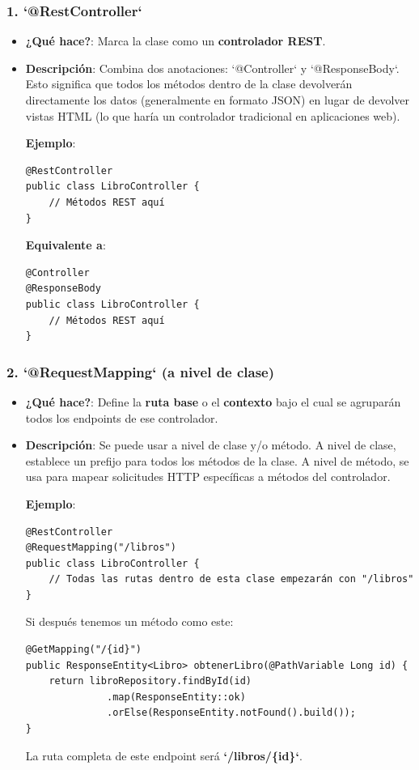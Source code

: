\documentclass[11pt]{article}
\begin{document}
\subsubsection{1. \textbf{\textbf{`@RestController`}}}
\label{sec:org89bc9d5}
\begin{itemize}
\item \textbf{\textbf{¿Qué hace?}}: Marca la clase como un \textbf{\textbf{controlador REST}}.
\item \textbf{\textbf{Descripción}}: Combina dos anotaciones: `@Controller` y `@ResponseBody`. Esto significa que todos los métodos dentro de la clase devolverán directamente los datos (generalmente en formato JSON) en lugar de devolver vistas HTML (lo que haría un controlador tradicional en aplicaciones web).

\textbf{\textbf{Ejemplo}}:
\begin{verbatim}
@RestController
public class LibroController {
    // Métodos REST aquí
}
\end{verbatim}

\textbf{\textbf{Equivalente a}}:
\begin{verbatim}
@Controller
@ResponseBody
public class LibroController {
    // Métodos REST aquí
}
\end{verbatim}
\end{itemize}

\subsubsection{2. \textbf{\textbf{`@RequestMapping`}} (a nivel de clase)}
\label{sec:orgcd28d6c}
\begin{itemize}
\item \textbf{\textbf{¿Qué hace?}}: Define la \textbf{\textbf{ruta base}} o el \textbf{\textbf{contexto}} bajo el cual se agruparán todos los endpoints de ese controlador.
\item \textbf{\textbf{Descripción}}: Se puede usar a nivel de clase y/o método. A nivel de clase, establece un prefijo para todos los métodos de la clase. A nivel de método, se usa para mapear solicitudes HTTP específicas a métodos del controlador.

\textbf{\textbf{Ejemplo}}:
\begin{verbatim}
@RestController
@RequestMapping("/libros")
public class LibroController {
    // Todas las rutas dentro de esta clase empezarán con "/libros"
}
\end{verbatim}

Si después tenemos un método como este:

\begin{verbatim}
@GetMapping("/{id}")
public ResponseEntity<Libro> obtenerLibro(@PathVariable Long id) {
    return libroRepository.findById(id)
              .map(ResponseEntity::ok)
              .orElse(ResponseEntity.notFound().build());
}
\end{verbatim}

La ruta completa de este endpoint será \textbf{\textbf{`/libros/\{id\}`}}.
\end{itemize}
\end{document}
